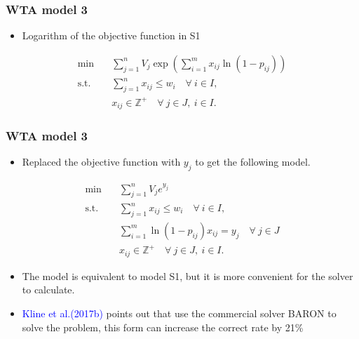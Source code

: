 \documentclass[CJK,10pt]{beamer}
\begin{document}
\begin{frame}
    \frametitle{WTA model 3}
    \begin{itemize}
        \item Logarithm of the objective function in S1
    \end{itemize}
    \begin{align*} \tag{S3.1}
        \min\quad & \sum_{j=1}^n V_j \exp \left( \sum_{i=1}^m {x_{ij}\ln(1 -  p_{ij})} \right) \\ 
        \mathrm{s. t.}\quad &\sum_{j=1}^n x_{ij} \leq w_i\quad \forall ~i \in I,\\
        & x_{ij} \in \mathbb{Z}^+ \quad \forall~ j\in J , ~ i \in I.
    \end{align*}
\end{frame}

\begin{frame}
    \frametitle{WTA model 3}
    \begin{itemize}
        \item Replaced the objective function with $y_j$ to get the following model.
    \end{itemize}
    \begin{align*} \tag{S3.2}
        \min\quad & \sum_{j=1}^n V_j e^{y_j}  \\ 
        \mathrm{s. t.}\quad &\sum_{j=1}^n x_{ij} \leq w_i\quad \forall ~i \in I,\\
        & \sum_{i=1}^m {\ln(1 -  p_{ij}) x_{ij}} = y_j \quad \forall ~ j \in J\\
        & x_{ij} \in \mathbb{Z}^+ \quad \forall~ j\in J , ~ i \in I.
    \end{align*}
    \begin{itemize}
        \item The model is equivalent to model S1, but it is more convenient for the solver to calculate.
        \item \textcolor{blue}{Kline et al.(2017b)} points out that use the commercial solver BARON to solve the problem, this form can increase the correct rate by 21\%
    \end{itemize}
\end{frame}
\end{document}
